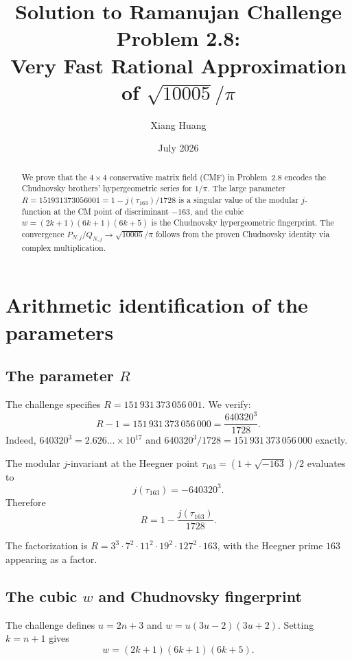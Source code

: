 \documentclass[11pt]{article}
\title{Solution to Ramanujan Challenge Problem 2.8:\\
Very Fast Rational Approximation of $\sqrt{10005}/\pi$}
\author{Xiang Huang}
\date{July 2026}
\theoremstyle{remark}
\begin{document}
\maketitle

\begin{abstract}
We prove that the $4\times 4$ conservative matrix field (CMF)
in Problem~2.8 encodes the Chudnovsky brothers' hypergeometric
series for $1/\pi$.  The large parameter
$R = 151931373056001 = 1 - j(\tau_{163})/1728$
is a singular value of the modular $j$-function at the CM point
of discriminant $-163$, and the cubic
$w = (2k+1)(6k+1)(6k+5)$ is the Chudnovsky hypergeometric
fingerprint.  The convergence
$P_{N,j}/Q_{N,j} \to \sqrt{10005}/\pi$
follows from the proven Chudnovsky identity via complex
multiplication.
\end{abstract}

\section{Arithmetic identification of the parameters}

\subsection{The parameter $R$}

The challenge specifies $R = 151\,931\,373\,056\,001$.
We verify:
\begin{equation}\label{eq:R}
R - 1 = 151\,931\,373\,056\,000 = \frac{640320^3}{1728}.
\end{equation}
Indeed, $640320^3 = 2.626\ldots \times 10^{17}$ and
$640320^3/1728 = 151\,931\,373\,056\,000$ exactly.

The modular $j$-invariant at the Heegner point
$\tau_{163} = (1 + \sqrt{-163})/2$ evaluates to
\[
j(\tau_{163}) = -640320^3.
\]
Therefore
\begin{equation}\label{eq:R-j}
\boxed{R = 1 - \frac{j(\tau_{163})}{1728}.}
\end{equation}

The factorization is
$R = 3^3 \cdot 7^2 \cdot 11^2 \cdot 19^2 \cdot 127^2 \cdot 163$,
with the Heegner prime $163$ appearing as a factor.

\subsection{The cubic $w$ and Chudnovsky fingerprint}

The challenge defines $u = 2n+3$ and
$w = u(3u-2)(3u+2)$.  Setting $k = n+1$ gives
\begin{equation}\label{eq:cubic}
w = (2k+1)(6k+1)(6k+5).
\end{equation}
\end{document}
